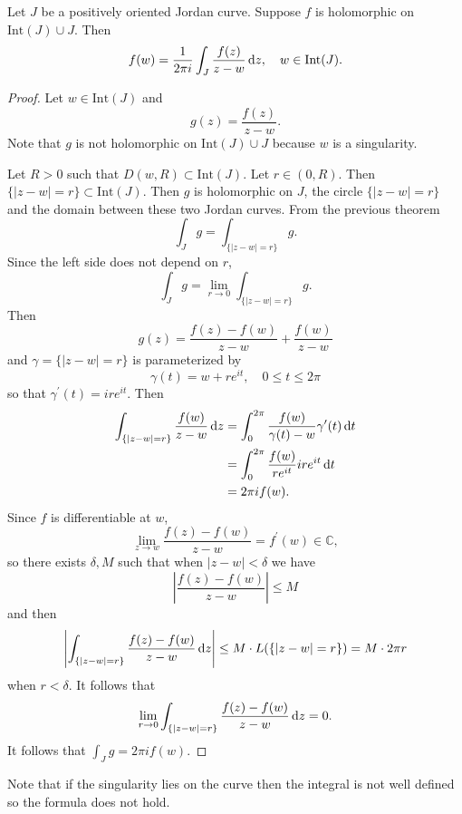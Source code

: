 \begin{theorem}
Let $J$ be a positively oriented Jordan curve. Suppose $f$
is holomorphic on $\mathrm{Int}(J) \cup J$. Then
$$
f(w) = \frac{1}{2 \pi i} \int_J \frac{f(z)}{z - w} \mathop{}\!\mathrm{d} z, \quad
w \in \mathrm{Int}(J).
$$
\end{theorem}
\begin{proof}
Let $w \in \mathrm{Int}(J)$ and
$$
g(z) = \frac{f(z)}{z - w}.
$$
Note that $g$ is not holomorphic on $\mathrm{Int}(J) \cup J$ because $w$ is a
singularity.

Let $R > 0$ such that $D(w, R) \subset \mathrm{Int}(J)$. Let $r \in (0, R)$.
Then $\{|z - w| = r \} \subset \mathrm{Int}(J)$. Then $g$ is holomorphic
on $J$, the circle $\{|z - w| = r\}$ and the domain between these two
Jordan curves. From the previous theorem
$$
\int_J g = \int_{\{|z - w| = r\}} g.
$$
Since the left side does not depend on $r$,
$$
\int_J g = \lim_{r \to 0} \int_{\{|z - w| = r\}} g.
$$
Then
$$
g(z) = \frac{f(z) - f(w)}{z - w} + \frac{f(w)}{z - w}
$$
and $\gamma = \{|z - w| = r\}$ is parameterized by
$$
\gamma(t) = w + r e^{it}, \quad 0 \leq t \leq 2\pi
$$
so that $\gamma^\prime(t) = i r e^{it}$.
Then
\begin{align*}
   \int_{\{|z - w| = r\}}
     \frac{f(w)}{z - w}
     \mathop{}\!\mathrm{d} z
&= \int_{0}^{2 \pi}
     \frac{f(w)}{\gamma(t) - w}
     \gamma^\prime(t)
     \mathop{}\!\mathrm{d} t \\
&= \int_0^{2\pi}
     \frac{f(w)}{re^{it}}
     i re^{it}
     \mathop{}\!\mathrm{d} t \\
&= 2 \pi i f(w).
\end{align*}
Since $f$ is differentiable at $w$,
$$
\lim_{z \to w} \frac{f(z) - f(w)}{z - w} = f^\prime(w) \in \mathbb{C},
$$
so there exists $\delta, M$ such that when $|z - w| < \delta$ we have
$$
\left|
  \frac{f(z) - f(w)}{z - w}
\right|
\leq M
$$
and then
$$
\left|
  \int_{\{|z - w| = r\}}
    \frac{f(z) - f(w)}{z - w}
    \mathop{}\!\mathrm{d} z
\right|
\leq
  M \cdot L(\{|z - w| = r\})
= M \cdot 2 \pi r
$$
when $r < \delta$. It follows that
$$
\lim_{r \to 0}
  \int_{\{|z - w| = r\}}
    \frac{f(z) - f(w)}{z - w}
    \mathop{}\!\mathrm{d} z
= 0.
$$
It follows that $\int_J g = 2 \pi i f(w)$.
\end{proof}

Note that if the singularity lies on the curve then
the integral is not well defined so the formula does not hold.


